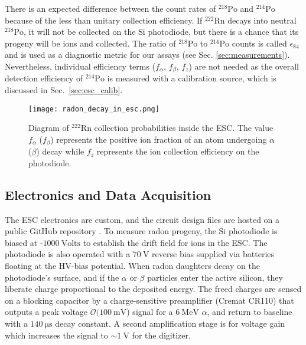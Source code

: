 \documentclass[final,3p,times]{elsarticle}
\begin{document}
There is an expected difference between the count rates of $^{218}\text{Po}$ and $^{214}\text{Po}$ because of the less than unitary collection efficiency. 
If $^{222}\text{Rn}$ decays into neutral $^{218}\text{Po}$, it will not be collected on the Si photodiode, but there is a chance that its progeny will be ions and collected.
The ratio of $^{218}\text{Po}$ to $^{214}\text{Po}$ counts is called $\epsilon_{84}$ and is used as a diagnostic metric for our assays (see Sec. \ref{sec:measurements}).
Nevertheless, individual efficiency terms ($f_\alpha$, $f_\beta$, $f_z$) are not needed as the overall detection efficiency of $^{214}\text{Po}$ is measured with a calibration source, which is discussed in Sec.~\ref{sec:esc_calib}.
\begin{figure}
\centering
  \texttt{[image: radon\_decay\_in\_esc.png]}
  \caption{Diagram of $^{222}\text{Rn}$ collection probabilities inside the ESC. The value $f_\alpha$ ($f_\beta$) represents the positive ion fraction of an atom undergoing $\alpha$ ($\beta$) decay while $f_z$ represents the ion collection efficiency on the photodiode.}
  \label{fig:rn_decay_proc}
\end{figure}



\subsection{Electronics and Data Acquisition}
The ESC electronics are custom, and the circuit design files are hosted on a public GitHub repository \cite{ESC_Electronics}.
To measure radon progeny, the Si photodiode is biased at -$1000~\text{Volts}$ to establish the drift field for ions in the ESC.
The photodiode is also operated with a $70~\text{V}$ reverse bias supplied via batteries floating at the HV-bias potential.
When radon daughters decay on the photodiode's surface, and if the $\alpha$ or $\beta$ particles enter the active silicon, they liberate charge proportional to the deposited energy. %
The freed charges are sensed on a blocking capacitor by a charge-sensitive preamplifier (Cremat CR110) that outputs a peak voltage $\mathcal{O}(100~\mathrm{mV}$) signal for a $6~\mathrm{MeV}$ $\alpha$, and return to baseline with a $140~\mathrm{\mu s}$ decay constant.
A second amplification stage is for voltage gain which increases the signal to $\sim 1~\mathrm{V}$ for the digitizer.  
\end{document}
